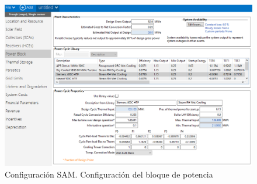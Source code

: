 \documentclass[11pt]{article}
\begin{document}
\begin{figure}
\includegraphics[scale=0.8]{images/captura_sam04.png}
\caption{Configuración SAM. Configuración del bloque de potencia} 
\label{fig:captura04}
\end{figure}
\end{document}
